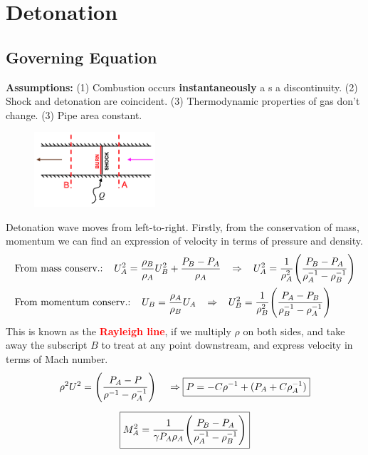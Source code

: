 \documentclass[a4paper,10pt]{article}
\begin{document}
\newpage
\section{Detonation}
\subsection{Governing Equation}
\textbf{Assumptions:} (1) Combustion occurs \textbf{instantaneously} a s a discontinuity. (2) Shock and detonation are coincident. (3) Thermodynamic properties of gas don't change. (3) Pipe area constant.

\begin{figure}[H]
    \centering
    \includegraphics[width=0.4\textwidth]{Figure/detonation scheme.png}
\end{figure}

\vspace*{-0.5cm}
Detonation wave moves from left-to-right. Firstly, from the conservation of mass, momentum we can find an expression of velocity in terms of pressure and density. 
\begin{gather*}
    \begin{split}
        &\text{From mass conserv.:}\hspace*{0.4cm}U_A^2 = \frac{\rho_B}{\rho_A}U_B^2+\frac{P_B-P_A}{\rho_A}\hspace*{0.3cm}\Rightarrow\hspace*{0.3cm}U_A^2 = \frac{1}{\rho_A^2}\Bigg(\frac{P_B-P_A}{\rho_A^{-1}-\rho_B^{-1}}\Bigg)\\
        &\text{From momentum conserv.:}\hspace*{0.4cm}U_B = \frac{\rho_A}{\rho_B}U_A\hspace*{0.3cm}\Rightarrow\hspace*{0.3cm}U_B^2 = \frac{1}{\rho_B^2}\Bigg(\frac{P_A-P_B}{\rho_B^{-1}-\rho_A^{-1}}\Bigg)\\
    \end{split} 
\end{gather*}
This is known as the \textcolor{red}{\textbf{Rayleigh line}}, if we multiply $\rho$ on both sides, and take away the subscript $B$ to treat at any point downstream, and express velocity in terms of Mach number. 
\begin{gather*}
    \rho^2U^2 = \Bigg(\frac{P_A-P}{\rho^{-1}-\rho_A^{-1}}\Bigg)\hspace*{0.4cm}\Rightarrow\boxed{P = -C\rho^{-1}+(P_A+C\rho_A^{-1})}\\[0.2cm]
    \boxed{M_A^2 = \frac{1}{\gamma P_A\rho_A}\Bigg(\frac{P_B-P_A}{\rho_A^{-1}-\rho_B^{-1}}\Bigg)}
\end{gather*}
\end{document}
